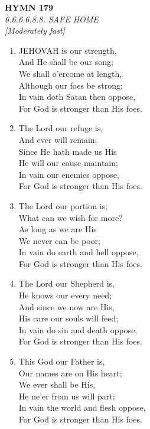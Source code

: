 \documentclass[11pt,a4paper]{article}
\begin{document}
\newpage
\begin{center}
    {\Large \textbf{HYMN 179}}
    \\
    \textit{6.6.6.6.8.8. SAFE HOME}
    \\
    \textit{\small [Moderately fast]}
\end{center}
\vspace{1em}

\begin{enumerate}
    \item JEHOVAH is our strength, \\
        And He shall be our song; \\
        We shall o'ercome at length, \\
        Although our foes be strong; \\
        In vain doth Satan then oppose, \\
        For God is stronger than His foes.

    \item The Lord our refuge is, \\
        And ever will remain; \\
        Since He hath made us His \\
        He will our cause maintain; \\
        In vain our enemies oppose, \\
        For God is stronger than His foes.

    \item The Lord our portion is; \\
        What can we wish for more? \\
        As long as we are His \\
        We never can be poor; \\
        In vain do earth and hell oppose, \\
        For God is stronger than His foes.

    \item The Lord our Shepherd is, \\
        He knows our every need; \\
        And since we now are His, \\
        His care our souls will feed; \\
        In vain do sin and death oppose, \\
        For God is stronger than His foes.

    \item This God our Father is, \\
        Our names are on His heart; \\
        We ever shall be His, \\
        He ne'er from us will part; \\
        In vain the world and flesh oppose, \\
        For God is stronger than His foes.

\end{enumerate}
\end{document}
